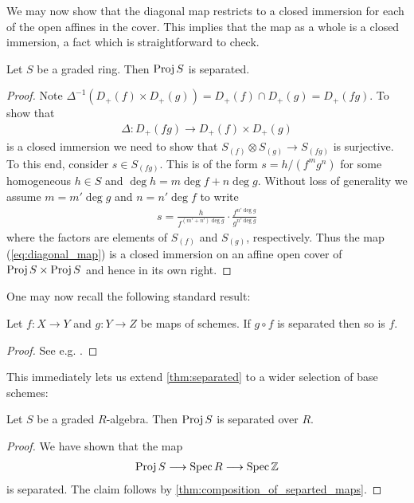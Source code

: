 \documentclass{article}
\begin{document}
We may now show that the diagonal map restricts to a closed immersion
for each of the open affines in the cover. This implies that the
map as a whole is a closed immersion, a fact which is straightforward
to check.

\begin{theorem}\label{thm:separated}
  Let $S$ be a graded ring. Then $\operatorname{Proj} S$ is separated.
  \begin{proof}
    Note ${\Delta}^{-1}(D_+(f)\times D_+(g)) = D_+(f)\cap D_+(g) = D_+(fg)$.
    To show that
    \begin{align*}
      \Delta : D_+(fg) \to D_+(f)\times D_+(g)
    \end{align*}
    is a closed immersion we need to show that
    $S_{(f)}\otimes S_{(g)}\to S_{(fg)}$ is surjective. To this end,
    consider $s\in S_{(fg)}$. This is of the form
    $s=h/(f^m g^n)$ for some homogeneous $h\in S$ and
    $\deg h = m\deg f + n\deg g$. Without loss of generality we assume
    $m = m'\deg g$ and $n=n'\deg f$ to write
    \begin{align*}
      s = \frac{h}{f^{(m'+n')\deg g}} \cdot \frac{f^{n'\deg g}}{g^{n'\deg g}}
    \end{align*}
    where the factors are elements of $S_{(f)}$ and $S_{(g)}$,
    respectively. Thus the map (\ref{eq:diagonal_map}) is a closed
    immersion on an affine open cover of $\operatorname{Proj} S\times \operatorname{Proj} S$
    and hence in its own right.
  \end{proof}
\end{theorem}

One may now recall the following standard result:

\begin{lemma}\label{thm:composition_of_separted_maps}
  Let $f:X\to Y$ and $g:Y\to Z$ be maps of schemes. If $g\circ f$ is
  separated then so is $f$.
  \begin{proof}
    See e.g. {\cite[\href{https://stacks.math.columbia.edu/tag/01KV}{Tag 01KV}]{stacks-project}}.
  \end{proof}
\end{lemma}

This immediately lets us extend \ref{thm:separated} to a wider
selection of base schemes:

\begin{corollary}
  Let $S$ be a graded $R$-algebra.
  Then $\operatorname{Proj} S$ is separated over $R$.
  \begin{proof}
    We have shown that the map
    \begin{align*}
      \operatorname{Proj} S \longrightarrow \operatorname{Spec} R \longrightarrow \operatorname{Spec}\mathbb{Z}
    \end{align*}
    is separated. The claim follows by \ref{thm:composition_of_separted_maps}.
  \end{proof}
\end{corollary}
\end{document}
